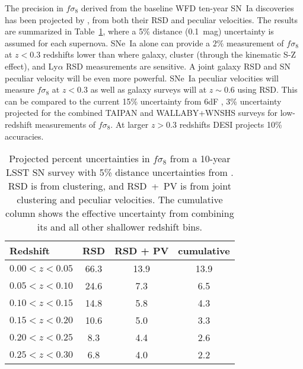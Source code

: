 \documentclass{aastex62}   	%
\begin{document}
The precision in  $f\sigma_8$ derived from the baseline WFD ten-year SN~Ia discoveries has been projected by \citet{2017ApJ...847..128H},
from both their RSD and peculiar velocities.
The results are summarized in Table~\ref{tab:howlett}, where a 5\% distance (0.1~mag) uncertainty is assumed for each supernova.
SNe~Ia alone can provide a $2\%$ measurement of $f\sigma_8$ at $z<0.3$ redshifts lower than where galaxy, cluster (through the
kinematic S-Z effect), and Ly$\alpha$
RSD measurements are sensitive.  A joint galaxy RSD and SN peculiar velocity will be even more powerful.
SNe~Ia peculiar velocities will measure $f\sigma_8$ at $z<0.3$  as well as galaxy surveys will at $z \sim 0.6$ using RSD. 
This can be compared to the current 15\% uncertainty from 6dF \citep{2017MNRAS.471..839A}, 3\% uncertainty projected
for the combined TAIPAN and WALLABY+WNSHS surveys \citep{2017MNRAS.464.2517H} for low-redshift measurements of $f\sigma_8$.
At larger $z>0.3$ redshifts DESI projects 10\% accuracies.

\begin{table}
   \centering
   \begin{tabular}{@{} lccc @{}} %
	\hline
	Redshift & RSD & RSD + PV & cumulative\\ \hline
      $0.00<z<0.05$   & 66.3 & 13.9 & 13.9\\
     $0.05<z<0.10$            & 24.6     &  7.3 & 6.5\\
     $0.10<z<0.15$      & 14.8  & 5.8 & 4.3\\
     $0.15<z<0.20$      & 10.6  & 5.0 & 3.3\\
      $0.20<z<0.25$     & 8.3  & 4.4 & 2.6\\
     $0.25<z<0.30$  & 6.8  &  4.0 & 2.2\\
      \hline
   \end{tabular}
   \caption{Projected percent uncertainties in $f\sigma_8$ from a 10-year LSST SN survey with 5\% distance uncertainties from
   \citet{2017ApJ...847..128H}. RSD is from clustering, and RSD~+~PV is from joint clustering and peculiar velocities.
   The cumulative column shows the effective uncertainty from combining its and all other shallower redshift bins.}
   \label{tab:howlett}
\end{table}
\end{document}
